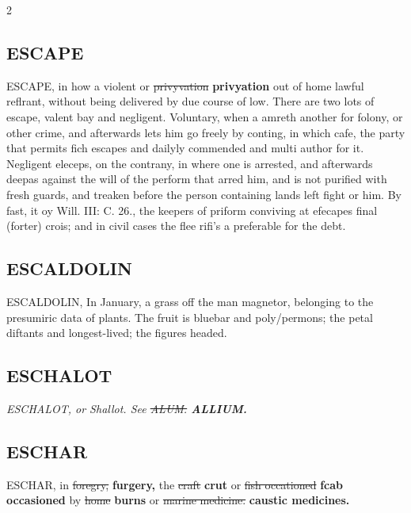 \documentclass[10pt]{article}
\begin{document}
\begin{multicols}{2}
\subsection*{ESCAPE}
ESCAPE, in how a violent or \sout{privyvation} \textbf{privyation} out of home lawful reflrant, without being delivered by due course of low. There are two lots of escape, valent bay and negligent. Voluntary, when a amreth another for folony, or other crime, and afterwards lets him go freely by conting, in which cafe, the party that permits fich escapes and dailyly commended and multi author for it. Negligent eleceps, on the contrany, in where one is arrested, and afterwards deepas against the will of the perform that arred him, and is not purified with fresh guards, and treaken before the person containing lands left fight or him. By fast, it oy Will. III: C. 26., the keepers of priform conviving at efecapes final (forter) crois; and in civil cases the flee rifi's a preferable for the debt.

\subsection*{ESCALDOLIN}
ESCALDOLIN, In January, a grass off the man magnetor, belonging to the presumiric data of plants. The fruit is bluebar and poly/permons; the petal diftants and longest-lived; the figures headed.

\subsection*{ESCHALOT}
\textit{ESCHALOT, or Shallot. See \sout{ALUM.} \textbf{ALLIUM.}}

\subsection*{ESCHAR}
ESCHAR, in \sout{foregry,} \textbf{furgery,} the \sout{craft} \textbf{crut} or \sout{fish occationed} \textbf{fcab occasioned} by \sout{home} \textbf{burns} or \sout{marine medicine.} \textbf{caustic medicines.}


\end{multicols}
\end{document}

